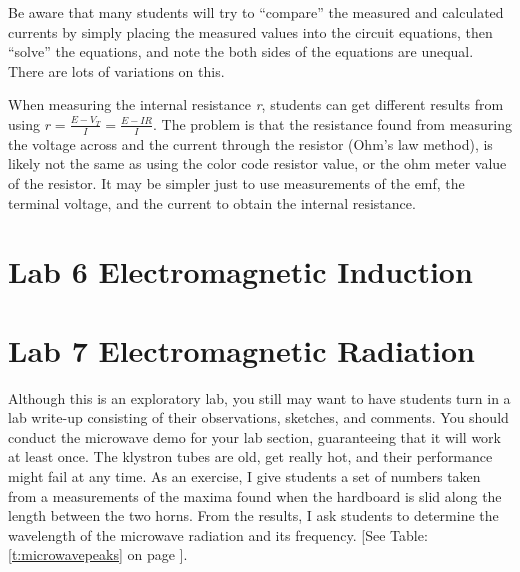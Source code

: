 Be aware that many students will try to ``compare'' the measured and calculated currents by simply placing the measured values into the circuit equations, then ``solve'' the equations, and note the both sides of the equations are unequal. There are lots of variations on this. 

When measuring the internal resistance \emph{r}, students can get different results from using 
$r  =  \frac{E - V_T}{I} = \frac{E - IR}{I}$. The problem is that the resistance found from measuring the voltage across and the current through the resistor (Ohm's law method), is likely not the same as using the color code resistor value, or the ohm meter value of the resistor. It may be simpler just to use measurements of the emf, the terminal voltage, and the current to obtain the internal resistance.

\section{Lab 6 Electromagnetic Induction}

\section{Lab 7 Electromagnetic Radiation}
Although this is an exploratory lab, you still may want to have students turn in a lab write-up consisting of their observations, sketches, and comments. You should conduct the microwave demo for your lab section, guaranteeing that it will work at least once. The klystron tubes are old, get really hot, and their performance might fail at any time. As an exercise, I give students a set of numbers taken from a measurements of the maxima found when the hardboard is slid along the length between the two horns. From the results, I ask students to determine the wavelength of the microwave radiation and its frequency. [See Table: \ref{t:microwavepeaks} on page \pageref{t:microwavepeaks}].


